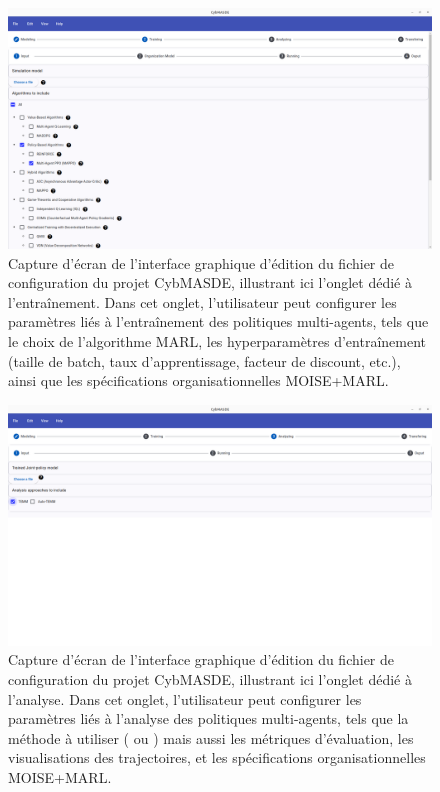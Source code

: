 \begin{figure}[h!]
       \centering
       \includegraphics[width=\linewidth]{figures/training_screenshot.png}
       \caption[Capture d'écran de l'onglet entraînement de l'interface graphique de CybMASDE]{Capture d'écran de l'interface graphique d'édition du fichier de configuration du projet CybMASDE, illustrant ici l'onglet dédié à l'entraînement. Dans cet onglet, l'utilisateur peut configurer les paramètres liés à l'entraînement des politiques multi-agents, tels que le choix de l'algorithme MARL, les hyperparamètres d'entraînement (taille de batch, taux d'apprentissage, facteur de discount, etc.), ainsi que les spécifications organisationnelles MOISE+MARL.}
       \label{fig:cybmasde_screenshot_training}
\end{figure}

\begin{figure}[h!]
       \centering
       \includegraphics[width=\linewidth]{figures/analyzing_screenshot.png}
       \caption[Capture d'écran de l'onglet analyse de l'interface graphique de CybMASDE]{Capture d'écran de l'interface graphique d'édition du fichier de configuration du projet CybMASDE, illustrant ici l'onglet dédié à l'analyse. Dans cet onglet, l'utilisateur peut configurer les paramètres liés à l'analyse des politiques multi-agents, tels que la méthode à utiliser ( ou ) mais aussi les métriques d'évaluation, les visualisations des trajectoires, et les spécifications organisationnelles MOISE+MARL.}
       \label{fig:cybmasde_screenshot_analyzing}
\end{figure}


